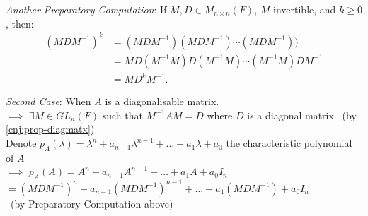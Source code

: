 \documentclass[
  12pt,
  a4paper,
  twoside]{article}
\theoremstyle{plain}
\theoremstyle{definition}
\begin{document}
\emph{Another Preparatory Computation}: If \(M,D\in M_{n\times n}(F)\), \(M\) invertible, and \(k\geq0\), then:
\begin{align*}
(MDM^{-1})^k &= (M D M^{-1})(M D M^{-1}) \cdots (M D M^{-1})) \\
&= M D (M^{-1} M) D (M^{-1} M) \cdots (M^{-1} M) D M^{-1}\\
&= M D^{k} M^{-1}. 
\end{align*}

\emph{Second Case}: When \(A\) is a diagonalisable matrix.\\
\(\implies\) \(\exists M \in GL_{n}(F)\) such that \(M^{-1} AM = D\)
where \(D\) is a diagonal matrix \hfill~{(by \ref{cnj:prop-diagmatx})}\\
Denote \(p_{A}( \lambda ) = \lambda^{n} + a_{n-1} \lambda^{n-1} + \dots + a_{1} \lambda + a_{0}\) the characteristic polynomial of \(A\)\\
\(\implies\) \(p_{A}(A) = A^{n} + a_{n-1} A^{n-1} + \dots + a_{1} A + a_{0} I_{n}\)\\
\hspace*{0.333em}\hspace*{0.333em}\hspace*{0.333em}\hspace*{0.333em}\hspace*{0.333em}\hspace*{0.333em}\hspace*{0.333em}\hspace*{0.333em}\hspace*{0.333em}\hspace*{0.333em}\hspace*{0.333em}\hspace*{0.333em} \(= (M D M^{-1})^{n} + a_{n-1} (M D M^{-1})^{n-1} + \dots + a_{1} (M D M^{-1}) + a_{0} I_{n}\)\\
\hspace*{0.333em}\hspace*{0.333em}\hspace*{0.333em}\hspace*{0.333em}\hspace*{0.333em}\hspace*{0.333em}\hspace*{0.333em}\hspace*{0.333em}\hspace*{0.333em}\hspace*{0.333em}\hspace*{0.333em}\hspace*{0.333em} \hfill~{(by Preparatory Computation above)}\\
\end{document}
